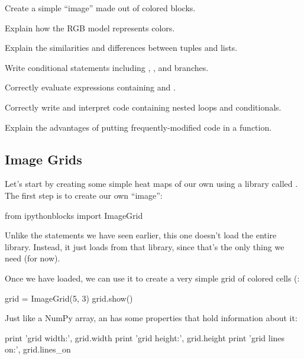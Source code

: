 \begin{objectives}
\begin{swcitemize}
\item
  Create a simple ``image'' made out of colored blocks.
\item
  Explain how the RGB model represents colors.
\item
  Explain the similarities and differences between tuples and lists.
\item
  Write conditional statements including , , and
   branches.
\item
  Correctly evaluate expressions containing  and
  .
\item
  Correctly write and interpret code containing nested loops and
  conditionals.
\item
  Explain the advantages of putting frequently-modified code in a
  function.
\end{swcitemize}
\end{objectives}

\subsection{Image Grids}

Let's start by creating some simple heat maps of our own using a library
called . The first step is to create our own
``image'':

\begin{VerbIn}
from ipythonblocks import ImageGrid
\end{VerbIn}

Unlike the  statements we have seen earlier, this one
doesn't load the entire  library. Instead, it just
loads  from that library, since that's the only thing
we need (for now).

Once we have  loaded, we can use it to create a very
simple grid of colored cells (:

\begin{VerbIn}
grid = ImageGrid(5, 3)
grid.show()
\end{VerbIn}


Just like a NumPy array, an  has some properties that
hold information about it:

\begin{VerbIn}
print 'grid width:', grid.width
print 'grid height:', grid.height
print 'grid lines on:', grid.lines_on
\end{VerbIn}

